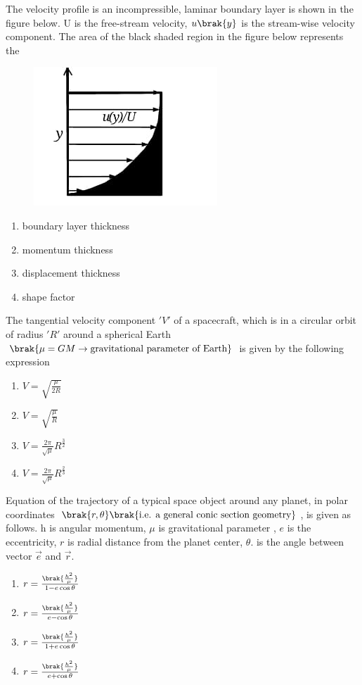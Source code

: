 \item The velocity profile is an incompressible, laminar boundary layer is shown in the figure below. U is the free-stream velocity, $u\brak{y}$ is the stream-wise velocity component. The area of the black shaded region in the figure below represents the 
\begin{figure}[!ht]
\centering
\includegraphics[width=0.3\linewidth]{figs/2018-AE/fig1.png}
\end{figure}
\begin{enumerate}
    \item boundary layer thickness
    \item momentum thickness
    \item displacement thickness
    \item shape factor
\end{enumerate}
\item The tangential velocity component $'V'$ of a spacecraft, which is in a circular orbit of radius $'R'$ around a spherical Earth$\brak{\mu = GM\rightarrow\text{gravitational parameter of Earth}}$ is given by the following expression
\begin{enumerate}
    \item $V=\sqrt{\frac{\mu}{2R}}$
   \item $V=\sqrt{\frac{\mu}{R}}$
   \item $V=\frac{2\pi}{\sqrt{\mu}}R^{\frac{3}{2}}$
   \item $V=\frac{2\pi}{\sqrt{\mu}}R^{\frac{2}{3}}$
\end{enumerate}
\item Equation of the trajectory of  a typical space object around any planet, in polar coordinates $\brak{r,\theta}\brak{\text{i.e. a general conic section geometry}}$, is given as follows. h is angular momentum, $\mu$ is gravitational parameter , $e$ is the eccentricity, $r$ is radial distance from the planet center, $\theta$. is the angle between vector $\vec{e}$ and $\vec{r}$.
\begin{enumerate}
	\item $r=\frac{\brak{\frac{h^2}{\mu}}}{1-e\cos\theta}$
	\item $r=\frac{\brak{\frac{h^2}{\mu}}}{e-\cos\theta}$
	\item $r=\frac{\brak{\frac{h^2}{\mu}}}{1+e\cos\theta}$
	\item $r=\frac{\brak{\frac{h^2}{\mu}}}{e+\cos\theta}$
\end{enumerate}
